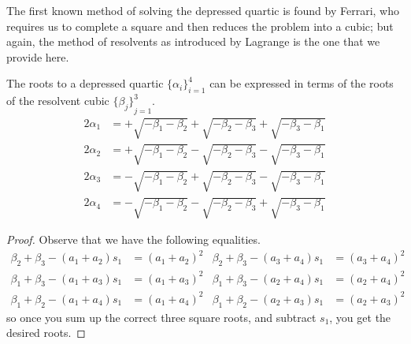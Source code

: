 \begin{remark}
    The first known method of solving the depressed quartic is found by Ferrari,
    who requires us to complete a square and then reduces the problem into a cubic;
    but again, the method of resolvents as introduced by Lagrange is the one that we provide here.
\end{remark}
\begin{theorem}
    The roots to a depressed quartic \({\{\alpha_i\}}_{i=1}^4\)
    can be expressed in terms of the roots of the resolvent cubic \({\{\beta_j\}}_{j=1}^3\).
    \begin{align*}
        2\alpha_1 &= + \sqrt{-\beta_1-\beta_2} + \sqrt{-\beta_2-\beta_3} + \sqrt{-\beta_3-\beta_1} \\
        2\alpha_2 &= + \sqrt{-\beta_1-\beta_2} - \sqrt{-\beta_2-\beta_3} - \sqrt{-\beta_3-\beta_1} \\
        2\alpha_3 &= - \sqrt{-\beta_1-\beta_2} + \sqrt{-\beta_2-\beta_3} - \sqrt{-\beta_3-\beta_1} \\
        2\alpha_4 &= - \sqrt{-\beta_1-\beta_2} - \sqrt{-\beta_2-\beta_3} + \sqrt{-\beta_3-\beta_1}
    \end{align*}
\end{theorem}
\begin{proof}
    Observe that we have the following equalities.
    \begin{align*}
        \beta_2 + \beta_3 - (a_1+a_2)s_1 &= {(a_1+a_2)}^2 &
        \beta_2 + \beta_3 - (a_3+a_4)s_1 &= {(a_3+a_4)}^2 \\
        \beta_1 + \beta_3 - (a_1+a_3)s_1 &= {(a_1+a_3)}^2 &
        \beta_1 + \beta_3 - (a_2+a_4)s_1 &= {(a_2+a_4)}^2 \\
        \beta_1 + \beta_2 - (a_1+a_4)s_1 &= {(a_1+a_4)}^2 &
        \beta_1 + \beta_2 - (a_2+a_3)s_1 &= {(a_2+a_3)}^2
    \end{align*}
    so once you sum up the correct three square roots, and subtract \(s_1\), you get the desired roots.
\end{proof}




